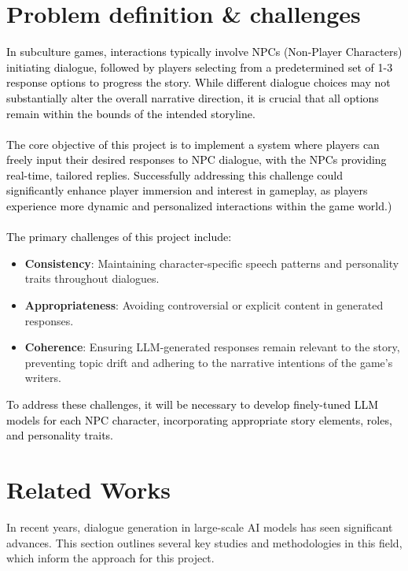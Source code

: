\documentclass{article}
\begin{document}
\section{Problem definition \& challenges}
\textcolor{black}{In subculture games, interactions typically involve NPCs (Non-Player Characters) initiating dialogue, followed by players selecting from a predetermined set of 1-3 response options to progress the story. While different dialogue choices may not substantially alter the overall narrative direction, it is crucial that all options remain within the bounds of the intended storyline.} \\\\
\textcolor{black}{The core objective of this project is to implement a system where players can freely input their desired responses to NPC dialogue, with the NPCs providing real-time, tailored replies. Successfully addressing this challenge could significantly enhance player immersion and interest in gameplay, as players experience more dynamic and personalized interactions within the game world.)} \\\\
\textcolor{black}{The primary challenges of this project include:}
\begin{itemize}
    \item \textbf{Consistency}: Maintaining character-specific speech patterns and personality traits throughout dialogues.
    \item \textbf{Appropriateness}: Avoiding controversial or explicit content in generated responses.
    \item \textbf{Coherence}: Ensuring LLM-generated responses remain relevant to the story, preventing topic drift and adhering to the narrative intentions of the game's writers.
\end{itemize}

\textcolor{black}{To address these challenges, it will be necessary to develop finely-tuned LLM models for each NPC character, incorporating appropriate story elements, roles, and personality traits.}

\section{Related Works}
In recent years, dialogue generation in large-scale AI models has seen significant advances. This section outlines several key studies and methodologies in this field, which inform the approach for this project.
\end{document}
